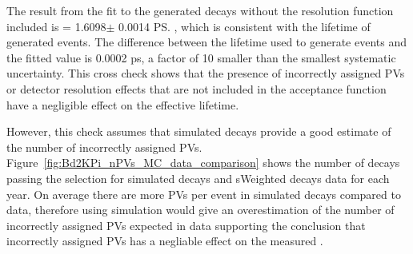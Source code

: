 The result from the fit to the generated decays without the resolution function included is \tmumu = 1.6098$\pm$ 0.0014 \ps, which is consistent with the lifetime of generated events. The difference between the lifetime used to generate events and the fitted value is 0.0002 ps, a factor of 10 smaller than the smallest systematic uncertainty. This cross check shows that the presence of incorrectly assigned PVs or detector resolution effects that are not included in the acceptance function have a negligible effect on the \bsmumu effective lifetime.



However, this check assumes that simulated decays provide a good estimate of the number of incorrectly assigned PVs. Figure~\ref{fig:Bd2KPi_nPVs_MC_data_comparison} shows the number of \bdkpi decays passing the selection for simulated \bdkpi decays and sWeighted decays data for each year. On average there are more PVs per event in simulated decays compared to data, therefore using simulation would give an overestimation of the number of incorrectly assigned PVs expected in data supporting the conclusion that incorrectly assigned PVs has a negliable effect on the measured \bsmumu \el. 

